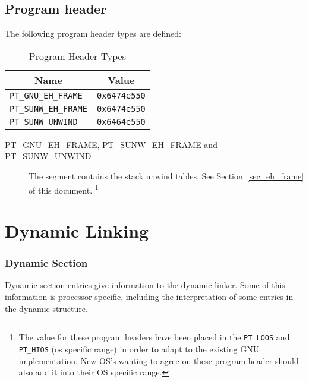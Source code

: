 
\subsection{Program header}

The following \xARCH program header types are defined:

\begin{table}[H]
\Hrule
  \caption{Program Header Types}
  \begin{center}
    \begin{tabular}[t]{l|l}
      \multicolumn{1}{c}{Name} & \multicolumn{1}{c}{Value} \\
      \hline
      \texttt{PT_GNU_EH_FRAME} & \texttt{0x6474e550} \\
      \texttt{PT_SUNW_EH_FRAME} & \texttt{0x6474e550} \\
      \texttt{PT_SUNW_UNWIND} & \texttt{0x6464e550}
    \end{tabular}
  \end{center}
\Hrule
\end{table}

\begin{description}
 \item[PT_GNU_EH_FRAME, PT_SUNW_EH_FRAME and PT_SUNW_UNWIND]
      The segment contains the stack unwind tables.
      See Section~\ref{sec_eh_frame} of this document.
      \footnote{
	The value for these program headers have been placed in the
	{\tt PT_LOOS} and {\tt PT_HIOS} (os specific range) in order to adapt
	to the existing GNU implementation.  New OS's wanting to
	agree on these program header should also add it into
	their OS specific range.
      }
\end{description}

\section{Dynamic Linking}

\subsubsection{Dynamic Section}

Dynamic section entries give information to the dynamic linker. Some
of this information is processor-specific, including the interpretation
of some entries in the dynamic structure.


